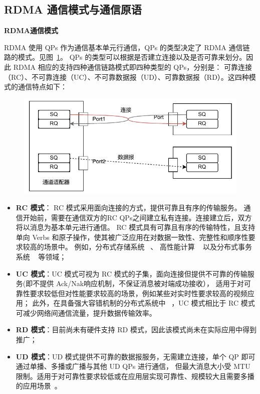 {    \subsection{RDMA 通信模式与通信原语}

    \textbf{RDMA通信模式}

    RDMA 使用 QPs 作为通信基本单元行通信，QPs 的类型决定了 RDMA 通信链路的模式。见图~\ref{fig:rdma-queue-pairs}。
    QPs 的类型可以根据是否建立连接以及是否可靠来划分。因此 RDMA 相应的支持四种通信链路模式即四种类型的 QPs，分别是：
    可靠连接（RC）、不可靠连接（UC）、不可靠数据报（UD）、可靠数据报（RD）。这四种模式的通信特点如下：

    \begin{figure}[!htbp]
        \centering
        \includegraphics[width=\linewidth]{Img/RDMA队列对.drawio.pdf}
        \label{fig:rdma-queue-pairs}
    \end{figure}

    \begin{itemize}
        \item \textbf{RC 模式}： RC 模式采用面向连接的方式，提供可靠且有序的传输服务。
              通信开始前，需要在通信双方的RC QPs之间建立私有连接。连接建立后，双方将以消息为基本单元进行通信。
              RC 模式具有可靠且有序的传输特性，且支持单向 Verbs 和原子操作，使其被广泛应用在对数据一致性、完整性和顺序性要求较高的场景中。
              例如，分布式存储系统 ~\citep{christopher2013pilaf, drago2014farm, xingda2020xstore}、
              高性能计算 ~\citep{graham2005OpenMPI, Huang2006MVAPICH2} 以及分布式事务系统 ~\citep{xingda2018DrTM+H} 等领域；
        \item \textbf{UC 模式}：UC 模式可视为 RC 模式的子集，面向连接但提供不可靠的传输服务(即不提供 Ack/Nak响应机制，不保证消息被对端成功接收），
              适用于对可靠性要求较低但对性能要求较高的场景，例如某些对实时性要求较高的视频应用；
              此外，在具备强大容错机制的分布式系统中 ~\citep{kalia2014herd}，UC 模式相比于 RC 模式可减少网络间通信流量，提升数据传输效率。
        \item \textbf{RD 模式}：目前尚未有硬件支持 RD 模式，因此该模式尚未在实际应用中得到推广；
        \item \textbf{UD 模式}：UD 模式提供不可靠的数据报服务，无需建立连接，单个 QP 即可通过单播、多播或广播与其他 UD QPs 进行通信，
              但最大消息大小受 MTU 限制。适用于对可靠性要求较低或在应用层实现可靠性、规模较大且需要多播的应用场景~\citep{kalia2014herd,kalia2016fasst}。
    \end{itemize}

}
